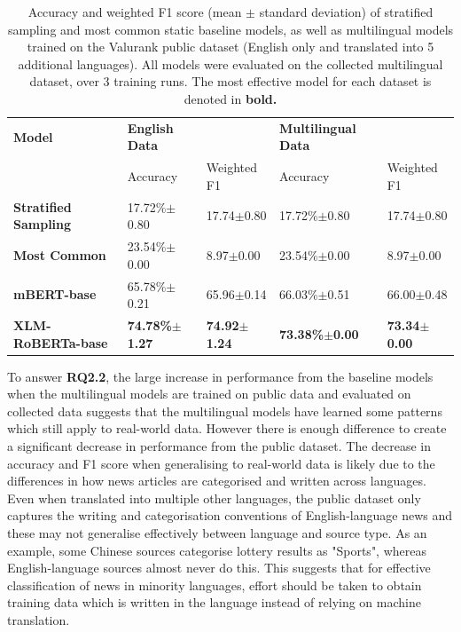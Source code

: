 \documentclass{l4proj}
\begin{document}
\begin{table}[h]
\begin{tabular}{lllll}
\hline
\textbf{Model}               & \textbf{English Data} &             & \textbf{Multilingual Data} &             \\ \cline{2-5} 
                             & Accuracy              & Weighted F1 & Accuracy                   & Weighted F1 \\ \hline
\textbf{Stratified Sampling} & 17.72\%$\pm$0.80     & 17.74$\pm$0.80 & 17.72\%$\pm$0.80     & 17.74$\pm$0.80            \\
\textbf{Most Common}         & 23.54\%$\pm$0.00     & 8.97$\pm$0.00 & 23.54\%$\pm$0.00     & 8.97$\pm$0.00 \\ \hline
\textbf{mBERT-base}          & 65.78\%$\pm$0.21     & 65.96$\pm$0.14         & 66.03\%$\pm$0.51        & 66.00$\pm$0.48         \\
\textbf{XLM-RoBERTa-base}    & \textbf{74.78\%$\pm$1.27}  & \textbf{74.92$\pm$1.24}        & \textbf{73.38\%$\pm$0.00}   & \textbf{73.34$\pm$0.00}        \\ \hline
\end{tabular}
\caption{Accuracy and weighted F1 score (mean $\pm$ standard deviation) of stratified sampling and most common static baseline models, as well as multilingual models trained on the Valurank public dataset (English only and translated into 5 additional languages). All models were evaluated on the collected multilingual dataset, over 3 training runs. The most effective model for each dataset is denoted in \textbf{bold.}}
\label{table:transferability}
\end{table}

To answer \textbf{RQ2.2}, the large increase in performance from the baseline models when the multilingual models are trained on public data and evaluated on collected data suggests that the multilingual models have learned some patterns which still apply to real-world data. However there is enough difference to create a significant decrease in performance from the public dataset. The decrease in accuracy and F1 score when generalising to real-world data is likely due to the differences in how news articles are categorised and written across languages. Even when translated into multiple other languages, the public dataset only captures the writing and categorisation conventions of English-language news and these may not generalise effectively between language and source type. As an example, some Chinese sources categorise lottery results as "Sports", whereas English-language sources almost never do this. This suggests that for effective classification of news in minority languages, effort should be taken to obtain training data which is written in the language instead of relying on machine translation.
\end{document}
